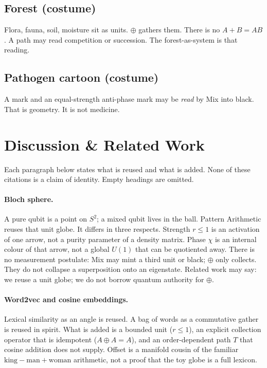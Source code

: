 \documentclass[12pt, a4paper]{article}
\begin{document}
\subsection{Forest (costume)}
Flora, fauna, soil, moisture sit as units. $\oplus$ gathers them.
There is no $A+B=AB$. A path may read competition or succession.
The forest-as-system is that reading.

\subsection{Pathogen cartoon (costume)}
A mark and an equal-strength anti-phase mark may be \emph{read}
by Mix into black. That is geometry. It is not medicine.

\section{Discussion \& Related Work}
\label{sec:related}

Each paragraph below states what is reused and what is added. None of
these citations is a claim of identity. Empty headings are omitted.

\paragraph{Bloch sphere.}
A pure qubit is a point on $S^2$; a mixed qubit lives in the ball.
Pattern Arithmetic reuses that unit globe. It differs in three
respects. Strength $r\le 1$ is an activation of one arrow, not a purity
parameter of a density matrix. Phase $\chi$ is an internal colour of
that arrow, not a global $U(1)$ that can be quotiented away. There is
no measurement postulate: Mix may mint a third unit or black; $\oplus$
only collects. They do not collapse a superposition onto an eigenstate. Related work
may say: we reuse a unit globe; we do not borrow quantum authority for
$\oplus$.

\paragraph{Word2vec and cosine embeddings.}
Lexical similarity as an angle is reused. A bag of words as a
commutative gather is reused in spirit. What is added is a bounded unit
($r\le 1$), an explicit collection operator that is idempotent
($A\oplus A=A$), and an order-dependent path $T$ that cosine addition
does not supply. Offset is a manifold cousin of the familiar
$\mathrm{king}-\mathrm{man}+\mathrm{woman}$ arithmetic, not a proof
that the toy globe is a full lexicon.
\end{document}
